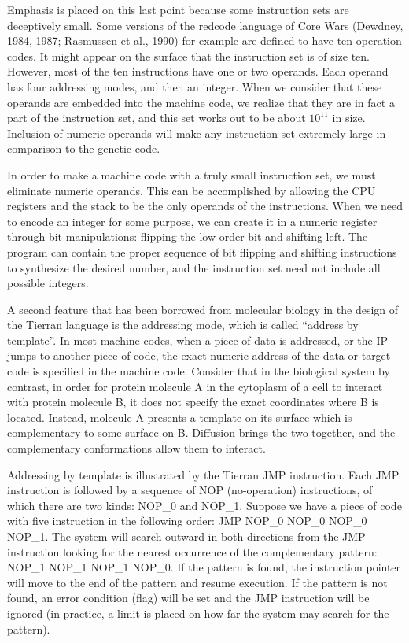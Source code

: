 Emphasis is placed on this last point because some instruction sets are
deceptively small.  Some versions of the redcode language of Core Wars
(Dewdney, 1984, 1987; Rasmussen et al., 1990) for
example are defined to have ten operation codes.  It might appear on the
surface that the instruction set is of size ten.  However, most of
the ten instructions have one or two operands.  Each operand has four
addressing modes, and then an integer.  When we consider that these operands
are embedded into the machine code, we realize that they are in fact
a part of the instruction set, and this set works out to be about $10^{11}$
in size.  Inclusion of numeric operands will make any instruction set
extremely large in comparison to the genetic code.

In order to make a machine code with a truly small instruction set, we must
eliminate numeric operands.  This can be accomplished by allowing the CPU
registers and the stack to be the only operands of the instructions.  When
we need to encode an integer for some purpose, we can create it in a numeric
register through bit manipulations: flipping the low order bit and shifting
left.  The program can contain the proper sequence of bit flipping and shifting
instructions to synthesize the desired number, and the instruction set need
not include all possible integers.

A second feature that has been borrowed from molecular biology in the design
of the Tierran language is the addressing mode, which is called ``address
by template''.  In most machine codes, when a piece of data is addressed, or
the IP jumps to another piece of code, the exact numeric address of the data
or target code is specified in the machine code.  Consider that in the
biological system by contrast, in order for protein molecule A in the cytoplasm
of a cell to interact with protein molecule B, it does not
specify the exact coordinates where B is located.  Instead, molecule A
presents a template on its surface which is complementary to some surface on
B.  Diffusion brings the two together, and the complementary conformations
allow them to interact.

Addressing by template is illustrated by the Tierran JMP instruction.  Each
JMP instruction is followed by a sequence of NOP (no-operation) instructions,
of which there are two kinds: NOP\_0 and NOP\_1.  Suppose we have a piece of
code with five instruction in the following order: JMP NOP\_0 NOP\_0 NOP\_0
NOP\_1.  The system will search outward in both directions from the JMP
instruction looking for the nearest occurrence of the complementary pattern:
NOP\_1 NOP\_1 NOP\_1 NOP\_0.  If the pattern is found, the instruction pointer
will move to the end of the pattern and resume execution.  If the pattern is
not found, an error condition (flag) will be set and the JMP instruction will
be ignored (in practice, a limit is placed on how far the system may search
for the pattern).

